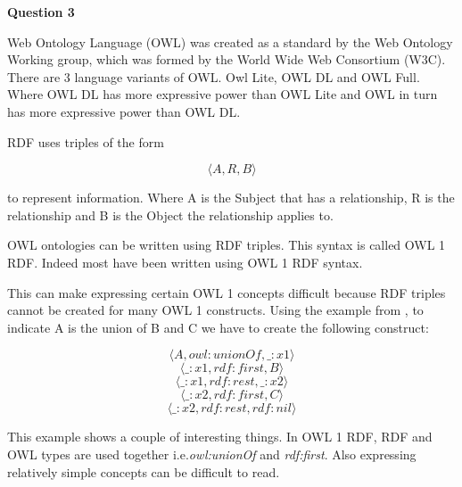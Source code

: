 \documentclass[12pt,a4paper]{article}
\begin{document}
\textbf{Question 3}
\newline

Web Ontology Language (OWL) was created as a standard by the Web Ontology Working group, which was formed by the World Wide Web Consortium (W3C). \cite{Grau2008} There are 3 language variants of OWL. Owl Lite, OWL DL and OWL Full. Where OWL DL has more expressive power than OWL Lite and OWL in turn has more expressive power than OWL DL. \citep{Patel}

RDF uses triples of the form

\[ 
\langle A, R, B \rangle
\]

to represent information. Where A is the Subject that has a relationship, R is the relationship and B is the Object the relationship applies to. \citep{Grau2008}

OWL ontologies can be written using RDF triples. This syntax is called OWL 1 RDF. Indeed most have been written using OWL 1 RDF syntax. \citep{Bechhofer2004}

This can make expressing certain OWL 1 concepts difficult because RDF triples cannot be created for many OWL 1 constructs. \citep{Grau2008} Using the example from \cite{Grau2008}, to indicate A is the union of B and C we have to create the following construct:

\[ \langle A,owl:unionOf,\_:x1 \rangle \]
\[ \langle \_:x1, rdf:first, B \rangle \]
\[ \langle \_:x1, rdf:rest, \_:x2 \rangle \]
\[ \langle \_:x2, rdf:first, C \rangle \]
\[ \langle \_:x2, rdf:rest, rdf:nil \rangle \] \citep{Grau2008}

This example shows a couple of interesting things. In OWL 1 RDF, RDF and OWL types are used together i.e.\emph{owl:unionOf} and \emph{rdf:first}. Also expressing relatively simple concepts can be difficult to read. 






\end{document}
